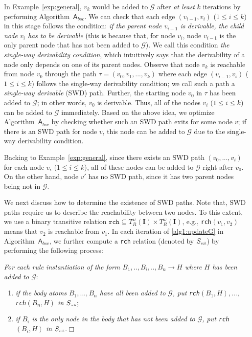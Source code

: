 \documentclass[final,1p,times]{elsarticle}
\begin{document}
In Example~\ref{exp:general}, $v_k$ would be added to $\mathcal{G}$ after \emph{at least} $k$
iterations by performing Algorithm~$\mathsf{A}_{bsc}$.
We can check that each edge $(v_{i-1},v_i)$ ($1\leq i\leq k$) in this stage follows the condition:
\emph{if the parent node $v_{i-1}$ is derivable, the child node $v_i$ has to be derivable} (this
is because that, for node $v_i$, node $v_{i-1}$ is the only parent node that has not been added to $\mathcal{G}$).
We call this condition \emph{the single-way derivability condition}, which intuitively says that the derivability of a
node only depends on one of its parent nodes.
Observe that node $v_k$ is reachable from node $v_0$ through the path $\tau=(v_0,v_1,...,v_k)$ where
each edge $(v_{i-1},v_i)$ ($1\leq i\leq k$) follows the single-way derivability condition;
we call such a path a \emph{single-way derivable} (SWD) path.
Further, the starting node $v_0$ in $\tau$ has been added to $\mathcal{G}$; in other words,
$v_0$ is derivable. Thus, all of the nodes $v_i$ ($1\leq i\leq k$) can be added to
$\mathcal{G}$ immediately.
Based on the above idea, we optimize Algorithm~$\mathsf{A}_{bsc}$ by checking whether such an SWD path
exits for some node $v$; if there is an SWD path for node $v$, this node can be added to $\mathcal{G}$
due to the single-way derivability condition.

Backing to Example~\ref{exp:general}, since
there exists an SWD path $(v_0,...,v_i)$ for each node $v_i$ ($1\leq i\leq k$), all of these nodes
can be added to $\mathcal{G}$ right after $v_0$. On the other hand,
node $v'$ has no SWD path, since it has two parent nodes being not in $\mathcal{G}$.

We next discuss how to determine the existence of SWD paths. Note that, SWD paths require us to
describe the reachability between two nodes. To this extent, we use a
binary transitive relation $\texttt{rch} \subseteq T_R^{\omega}(\textbf{I})\times T_R^{\omega}(\textbf{I})$,
e.g., \texttt{rch}$(v_1,v_2)$ means that $v_2$ is reachable from $v_1$.
In each iteration of \ref{alg1:updateG} in Algorithm~$\mathsf{A}_{bsc}$, we further compute a \texttt{rch}
relation (denoted by $S_{\textit{\tiny rch}}$) by performing the following process:

\begin{description}[leftmargin=2ex]
\item[(\textbf{\dag})] \emph{For each rule instantiation of the form $B_1,..,B_i,..,B_n\rightarrow H$
where $H$ has been added to $\mathcal{G}$}:
\begin{enumerate}[leftmargin=2ex]
\item \emph{if the body atoms $B_1,...,B_n$ have all been added to $\mathcal{G}$, put \texttt{rch}$(B_1,H),...,$ \texttt{rch}$(B_n,H)$ in $S_{\textit{\tiny rch}}$};
\item \emph{if $B_i$ is the only node in the body that has not been added to $\mathcal{G}$,
    put \texttt{rch}$(B_i,H)$ in $S_{\textit{\tiny rch}}$}.\hfill$\Box$
\end{enumerate}
\end{description}
\end{document}
